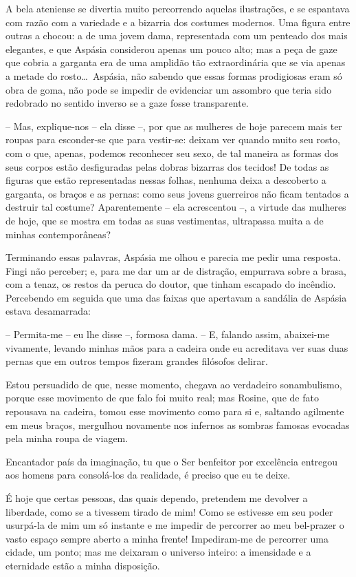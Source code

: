  A bela ateniense se divertia muito percorrendo aquelas ilustrações, e
se espantava com razão com a variedade e a bizarria dos costumes
modernos. Uma figura entre outras a chocou: a de uma jovem dama,
representada com um penteado dos mais elegantes, e que Aspásia
considerou apenas um pouco alto; mas a peça de gaze que cobria a
garganta era de uma amplidão tão extraordinária que se via apenas a
metade do rosto\ldots\ Aspásia, não sabendo que essas formas prodigiosas
eram só obra de goma, não pode se impedir de evidenciar um assombro que
teria sido redobrado no sentido inverso se a gaze fosse transparente.

 -- Mas, explique-nos -- ela disse --, por que as mulheres de hoje
parecem mais ter roupas para esconder-se que para vestir-se: deixam ver
quando muito seu rosto, com o que, apenas, podemos reconhecer seu sexo,
de tal maneira as formas dos seus corpos estão desfiguradas pelas
dobras bizarras dos tecidos! De todas as figuras que estão
representadas nessas folhas, nenhuma deixa a descoberto a garganta, os
braços e as pernas: como seus jovens guerreiros não ficam tentados a
destruir tal costume? Aparentemente -- ela acrescentou --, a virtude
das mulheres de hoje, que se mostra em todas as suas vestimentas,
ultrapassa muita a de minhas contemporâneas?

 Terminando essas palavras, Aspásia me olhou e parecia me pedir uma
resposta. Fingi não perceber; e, para me dar um ar de distração,
empurrava sobre a brasa, com a tenaz, os restos da peruca do doutor,
que tinham escapado do incêndio.  Percebendo em seguida que uma das
faixas que apertavam a sandália de Aspásia estava desamarrada:

-- Permita-me -- eu lhe disse --, formosa dama. -- E, falando
assim, abaixei-me vivamente, levando minhas mãos para a cadeira onde eu
acreditava ver suas duas pernas que em outros tempos fizeram grandes
filósofos delirar.

 Estou persuadido de que, nesse momento, chegava ao verdadeiro
sonambulismo, porque esse movimento de que falo foi muito real; mas
Rosine, que de fato repousava na cadeira, tomou esse movimento como
para si e, saltando agilmente em meus braços, mergulhou novamente nos
infernos as sombras famosas evocadas pela minha roupa de viagem.

 Encantador país da imaginação, tu que o Ser benfeitor por excelência
entregou aos homens para consolá-los da realidade, é preciso que eu te
deixe.

 É hoje que certas pessoas, das quais dependo, pretendem me devolver a
liberdade, como se a tivessem tirado de mim! Como se estivesse em seu
poder usurpá-la de mim um só instante e me impedir de percorrer ao meu
bel-prazer o vasto espaço sempre aberto a minha frente! Impediram-me de
percorrer uma cidade, um ponto; mas me deixaram o universo inteiro: a
imensidade e a eternidade estão a minha disposição.

